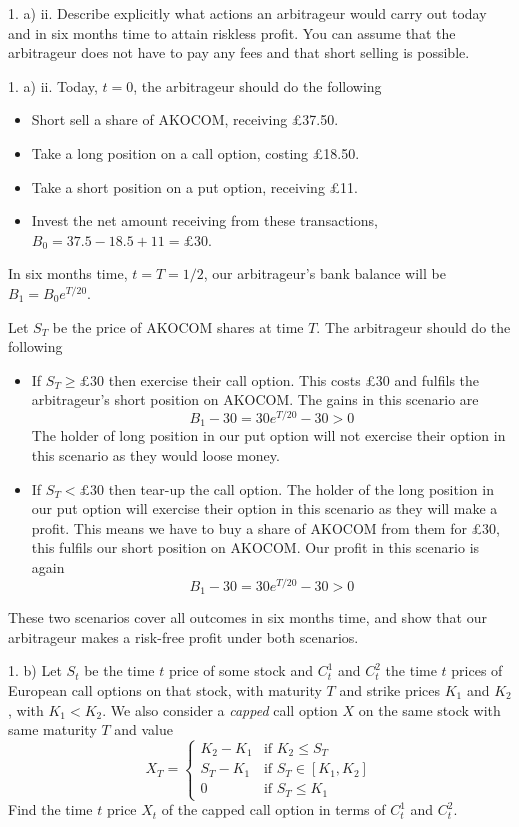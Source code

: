 \documentclass[11pt,a4paper]{article}
\begin{document}
\begin{question}{1. a) ii.}
  Describe explicitly what actions an arbitrageur would carry out today and in six months time to attain riskless profit. You can assume that the arbitrageur does not have to pay any fees and that short selling is possible.
\end{question}

\begin{answer}{1. a) ii.}
  Today, $t=0$, the arbitrageur should do the following
  \begin{itemize}
    \item Short sell a share of AKOCOM, receiving £37.50.
    \item Take a long position on a call option, costing £18.50.
    \item Take a short position on a put option, receiving £11.
    \item Invest the net amount receiving from these transactions, $B_0=37.5-18.5+11=\pounds30$.
  \end{itemize}
  In six months time, $t=T=1/2$, our arbitrageur's bank balance will be $B_1=B_0e^{T/20}$.
  \par Let $S_T$ be the price of AKOCOM shares at time $T$. The arbitrageur should do the following
  \begin{itemize}
    \item If $S_T\geq\pounds30$ then exercise their call option. This costs £30 and fulfils the arbitrageur's short position on AKOCOM. The gains in this scenario are
    \[ B_1-30=30e^{T/20}-30>0 \]
    The holder of long position in our put option will not exercise their option in this scenario as they would loose money.
    \item If $S_T<\pounds30$ then tear-up the call option. The holder of the long position in our put option will exercise their option in this scenario as they will make a profit. This means we have to buy a share of AKOCOM from them for £30, this fulfils our short position on AKOCOM. Our profit in this scenario is again
    \[ B_1-30=30e^{T/20}-30>0 \]
  \end{itemize}
  These two scenarios cover all outcomes in six months time, and show that our arbitrageur makes a risk-free profit under both scenarios.
\end{answer}

\begin{question}{1. b)}
  Let $S_t$ be the time $t$ price of some stock and $C_t^1$ and $C_t^2$ the time $t$ prices of European call options on that stock, with maturity $T$ and strike prices $K_1$ and $K_2$, with $K_1<K_2$. We also consider a \textit{capped} call option $X$ on the same stock with same maturity $T$ and value
  \[ X_T=\begin{cases}K_2-K_1&\text{if }K_2\leq S_T\\S_T-K_1&\text{if }S_T\in[K_1,K_2]\\0&\text{if }S_T\leq K_1\end{cases} \]
  Find the time $t$ price $X_t$ of the capped call option in terms of $C_t^1$ and $C_t^2$.
\end{question}
\end{document}
